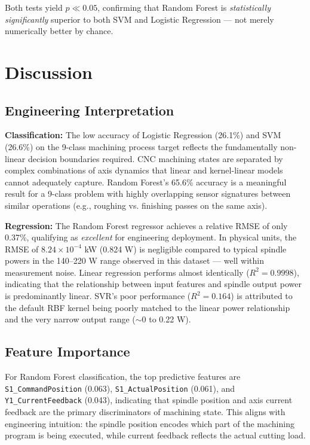 \documentclass[conference]{IEEEtran}
\begin{document}
Both tests yield $p \ll 0.05$, confirming that Random Forest is \textit{statistically
significantly} superior to both SVM and Logistic Regression — not merely numerically
better by chance.

\section{Discussion}
\label{sec:discussion}

\subsection{Engineering Interpretation}

\textbf{Classification:} The low accuracy of Logistic Regression (26.1\%) and SVM
(26.6\%) on the 9-class machining process target reflects the fundamentally non-linear
decision boundaries required. CNC machining states are separated by complex combinations
of axis dynamics that linear and kernel-linear models cannot adequately capture.
Random Forest's 65.6\% accuracy is a meaningful result for a 9-class problem with
highly overlapping sensor signatures between similar operations (e.g., roughing vs.
finishing passes on the same axis).

\textbf{Regression:} The Random Forest regressor achieves a relative RMSE of only
0.37\%, qualifying as \textit{excellent} for engineering deployment. In physical units,
the RMSE of $8.24 \times 10^{-4}$ kW (0.824 W) is negligible compared to typical
spindle powers in the 140--220 W range observed in this dataset — well within
measurement noise. Linear regression performs almost identically ($R^2 = 0.9998$),
indicating that the relationship between input features and spindle output power is
predominantly linear. SVR's poor performance ($R^2 = 0.164$) is attributed to the
default RBF kernel being poorly matched to the linear power relationship and the
very narrow output range ($\sim$0 to 0.22 W).

\subsection{Feature Importance}

For Random Forest classification, the top predictive features are
\texttt{S1\_CommandPosition} (0.063), \texttt{S1\_ActualPosition} (0.061), and
\texttt{Y1\_CurrentFeedback} (0.043), indicating that spindle position and axis
current feedback are the primary discriminators of machining state. This aligns with
engineering intuition: the spindle position encodes which part of the machining program
is being executed, while current feedback reflects the actual cutting load.
\end{document}
